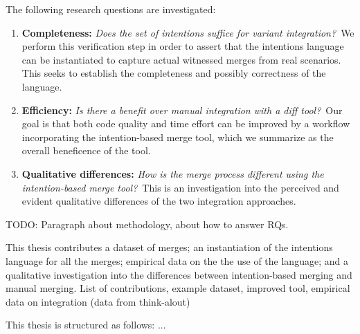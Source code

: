 The following research questions are investigated:

\newcommand{\RQA}{Does the set of intentions suffice for variant integration?}
\newcommand{\RQB}{Is there a benefit over manual integration with a diff tool?}
\newcommand{\RQC}{How is the merge process different using the intention-based merge tool?}

\begin{enumerate}[label={Q\arabic*}]

        \item\label{rq-a} \textbf{Completeness:} \textit{\RQA}~We perform this verification step in order to assert that the intentions language can be instantiated to capture actual witnessed merges from real scenarios. This seeks to establish the completeness and possibly correctness of the language.

        \item\label{rq-b} \textbf{Efficiency:} \textit{\RQB}~Our goal is that both code quality and time effort can be improved by a workflow incorporating the intention-based merge tool, which we summarize as the overall beneficence of the tool.

        
        \item\label{rq-c} \textbf{Qualitative differences:} \textit{\RQC}~This is an investigation into the perceived and evident qualitative differences of the two integration approaches.
        
\end{enumerate}

TODO: Paragraph about methodology, about how to answer RQs.

This thesis contributes a dataset of merges; an instantiation of the intentions language for all the merges; empirical data on the the use of the language; and a qualitative investigation into the differences between intention-based merging and manual merging.
List of contributions, example dataset, improved tool, empirical data on integration
(data from think-alout)

This thesis is structured as follows: ...


